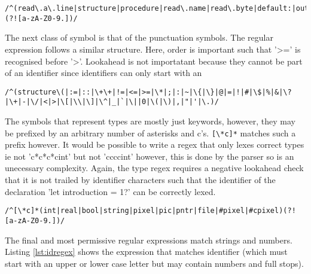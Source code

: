 \documentclass{article}
\begin{document}
\begin{lstlisting}[caption={},label={lst:keywordsregex}, escapechar="|"]
/^(read\.a\.line|structure|procedure|read\.name|read\.byte|default:|out\.byte|nullfile|forward|read\.32|#cpixel|maxreal|epsilon|read\.16|screen|maxint|repeat|#pixel|string|cursor|colour|rotate|out\.32|output|vector|out\.16|write|pixel|reads|readb|readr|image|limit|shift|scale|readi|begin|while|abort|false|peek|true|rand|onto|text|read|case|xnor|nand|from|copy|else|then|real|file|pntr|bool|isnt|end|xor|lwb|and|ror|upb|eof|int|off|nil|for|let|r\.w|i\.w|s\.w|s\.o|s\.i|div|rem|pic|nor|not|on|pi|do|is|by|if|to|of|at|or|in)(?![a-zA-Z0-9.])/
\end{lstlisting}

The next class of symbol is that of the punctuation symbols. The regular expression follows a similar structure. Here, order is important such that '>=' is recognised before '>'. Lookahead is not importatant because they cannot be part of an identifier since identifiers can only start with an 

\begin{lstlisting}[caption={},label={lst:puncregex}, escapechar="|"]
/^(structure\(|:=|::|\+\+|!=|<=|>=|\*|;|:|~|\{|\}|@|=|!|#|\$|%|&|\?|\+|-|\/|<|>|\[|\\|\]|\^|_|`|\||0|\(|\)|,|"|'|\.)/
\end{lstlisting}

The symbols that represent types are mostly just keywords, however, they may be prefixed by an arbitrary number of asterisks and c's. \lstinline{[\*c]*} matches such a prefix however. It would be possible to write a regex that only lexes correct types ie not 'c*c*c*cint' but not 'ccccint' however, this is done by the parser so is an unecessary complexity. Again, the type regex requires a negative lookahead check that it is not trailed by identifier characters such that the identifier of the declaration 'let introduction = 1?' can be correctly lexed.

\begin{lstlisting}[caption={},label={lst:typeregex}, escapechar="|"]
/^[\*c]*(int|real|bool|string|pixel|pic|pntr|file|#pixel|#cpixel)(?![a-zA-Z0-9.])/
\end{lstlisting}

The final and most permissive regular expressions match strings and numbers. Listing \ref{lst:idregex} shows the expression that matches identifier (which must start with an upper or lower case letter but may contain numbers and full stops).
\end{document}
